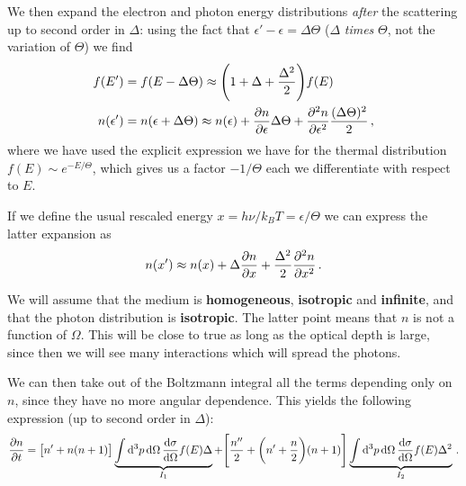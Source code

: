 \documentclass[main.tex]{subfiles}
\begin{document}

We then expand the electron and photon energy distributions \emph{after} the scattering up to second order in \(\Delta \): using the fact that \(\epsilon' - \epsilon = \Delta \Theta \) (\(\Delta \) \emph{times} \(\Theta \), not the variation of \(\Theta \)) we find
%
\begin{align}
f(E') &= f(E - \Delta \Theta ) \approx \qty(1 + \Delta + \frac{\Delta^2}{2}) f(E)  \\
n(\epsilon ') &= n( \epsilon + \Delta \Theta ) \approx n(\epsilon ) + \pdv{n}{\epsilon } \Delta \Theta 
+ \pdv[2]{n}{\epsilon } \frac{(\Delta \Theta )^2}{2 }
\,,
\end{align}
%
where we have used the explicit expression we have for the thermal distribution \(f(E) \sim e^{- E/ \Theta }\), which gives us a factor \(-1/\Theta\) each we differentiate with respect to \(E\). 

If we define the usual rescaled energy \(x = h \nu / k_B T = \epsilon / \Theta \) we can express the latter expansion as 
%
\begin{align}
n(x') \approx n(x) + \Delta \pdv{n}{x} + \frac{\Delta^2}{2} \pdv[2]{n}{x}
\,.
\end{align}

We will assume that the medium is \textbf{homogeneous}, \textbf{isotropic} and \textbf{infinite}, and that the photon distribution is \textbf{isotropic}. The latter point means that \(n\) is not a function of \(\Omega \). 
This will be close to true as long as the optical depth is large, since then we will see many interactions which will spread the photons. 

We can then take out of the Boltzmann integral all the terms depending only on \(n\), since they have no more angular dependence. This yields the following expression (up to second order in \(\Delta \)): 
%
\begin{align}
\pdv{n}{t} = \qty[n' + n(n+1)]
\underbrace{\int \dd[3]{p} \dd{\Omega } \dv{\sigma }{\Omega } f(E) \Delta }_{I_1 }
+ 
\qty[\frac{n''}{2}
+ \qty(n' + \frac{n}{2})
\qty(n+1)]
\underbrace{\int \dd[3]{p} \dd{\Omega } \dv{\sigma }{\Omega }
f(E) \Delta^2 }_{I_2 }
\,.
\end{align}
\end{document}
